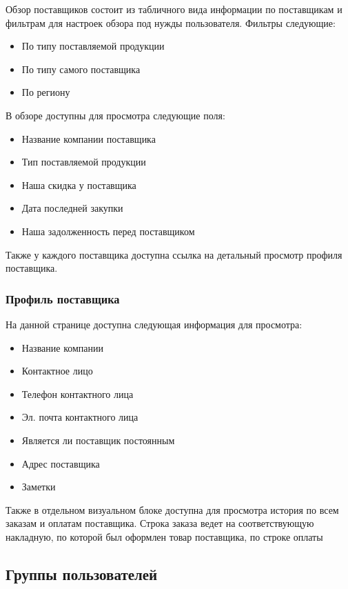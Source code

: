 \documentclass[DIV=calc, paper=a4, fontsize=11pt]{scrartcl} %
\begin{document}
Обзор поставщиков состоит из табличного вида информации по поставщикам и фильтрам для настроек обзора под нужды пользователя. Фильтры следующие:

\begin{itemize}
	\item По типу поставляемой продукции
	\item По типу самого поставщика 
	\item По региону
\end{itemize}

В обзоре доступны для просмотра следующие поля:

\begin{itemize}
	\item Название компании поставщика
	\item Тип поставляемой продукции
	\item Наша скидка у поставщика
	\item Дата последней закупки
	\item Наша задолженность перед поставщиком
\end{itemize}

Также у каждого поставщика доступна ссылка на детальный просмотр профиля поставщика.

\subsubsection{Профиль поставщика}

На данной странице доступна следующая информация для просмотра:

\begin{itemize}
	\item Название компании
	\item Контактное лицо
	\item Телефон контактного лица
	\item Эл. почта контактного лица
	\item Является ли поставщик постоянным
	\item Адрес поставщика
	\item Заметки
\end{itemize}

Также в отдельном визуальном блоке доступна для просмотра история по всем заказам и оплатам поставщика. Строка заказа ведет на соответствующую накладную, по которой был оформлен товар поставщика, по строке оплаты 


\subsection{Группы пользователей}
\end{document}
